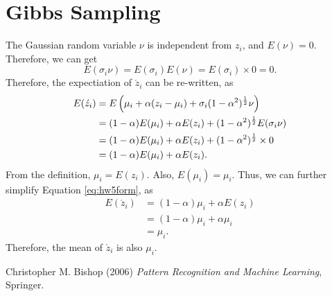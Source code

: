 \documentclass[journal,onecolumn,12pt]{IEEEtran}
\begin{document}
\section{Gibbs Sampling}
The Gaussian random variable $\nu$ is independent from ${z}_i$, and $E(\nu) = 0$. Therefore, we can get
\begin{equation}
E(\sigma_i \nu) = E(\sigma_i) E(\nu) = E(\sigma_i) \times 0 = 0. 
\end{equation}
Therefore, the expectiation of $ \acute{z}_i $ can be re-written, as
\begin{equation}
\begin{aligned}
E(\acute{z}_i)
 & = E\left(\mu_i + \alpha (z_i - \mu_i) +\sigma_i (1 - \alpha^2)^{{1}\over{2}}\nu \right)\\
 & = (1-\alpha) E(\mu_i) + \alpha E(z_i) + (1 - \alpha^2)^{{1}\over{2}} E( \sigma_i \nu )\\
 & = (1-\alpha) E(\mu_i) + \alpha E(z_i) +(1 - \alpha^2)^{{1}\over{2}} \times 0\\
 & = (1-\alpha) E(\mu_i) + \alpha E(z_i).
\end{aligned}
\label{eq:hw5form}
\end{equation}
From the definition, $\mu_i = E(z_i)$. Also, $E(\mu_i) = \mu_i$.
Thus, we can further simplify Equation \ref{eq:hw5form}, as
\begin{equation}
\begin{aligned}
E(\acute{z}_i)
 & = (1-\alpha) \mu_i + \alpha E(z_i)\\
 & = (1-\alpha) \mu_i + \alpha \mu_i\\
 & = \mu_i.
\end{aligned}
\end{equation}
Therefore, the mean of $\acute{z}_i$ is also $\mu_i$.



\begin{thebibliography}{9}
Christopher M. Bishop (2006) \emph{Pattern Recognition and Machine Learning}, Springer.
\end{thebibliography}
\end{document}
